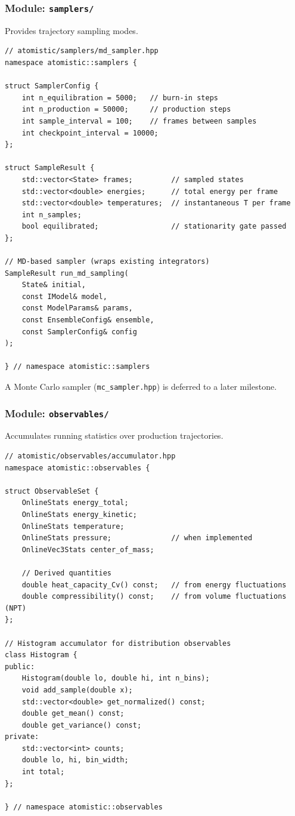 \documentclass[11pt]{article}
\begin{document}
\subsubsection{Module: \texttt{samplers/}}

Provides trajectory sampling modes.

\begin{lstlisting}
// atomistic/samplers/md_sampler.hpp
namespace atomistic::samplers {

struct SamplerConfig {
    int n_equilibration = 5000;   // burn-in steps
    int n_production = 50000;     // production steps
    int sample_interval = 100;    // frames between samples
    int checkpoint_interval = 10000;
};

struct SampleResult {
    std::vector<State> frames;         // sampled states
    std::vector<double> energies;      // total energy per frame
    std::vector<double> temperatures;  // instantaneous T per frame
    int n_samples;
    bool equilibrated;                 // stationarity gate passed
};

// MD-based sampler (wraps existing integrators)
SampleResult run_md_sampling(
    State& initial,
    const IModel& model,
    const ModelParams& params,
    const EnsembleConfig& ensemble,
    const SamplerConfig& config
);

} // namespace atomistic::samplers
\end{lstlisting}

A Monte Carlo sampler (\texttt{mc\_sampler.hpp}) is deferred to a later
milestone.

\subsubsection{Module: \texttt{observables/}}

Accumulates running statistics over production trajectories.

\begin{lstlisting}
// atomistic/observables/accumulator.hpp
namespace atomistic::observables {

struct ObservableSet {
    OnlineStats energy_total;
    OnlineStats energy_kinetic;
    OnlineStats temperature;
    OnlineStats pressure;              // when implemented
    OnlineVec3Stats center_of_mass;

    // Derived quantities
    double heat_capacity_Cv() const;   // from energy fluctuations
    double compressibility() const;    // from volume fluctuations (NPT)
};

// Histogram accumulator for distribution observables
class Histogram {
public:
    Histogram(double lo, double hi, int n_bins);
    void add_sample(double x);
    std::vector<double> get_normalized() const;
    double get_mean() const;
    double get_variance() const;
private:
    std::vector<int> counts;
    double lo, hi, bin_width;
    int total;
};

} // namespace atomistic::observables
\end{lstlisting}
\end{document}
